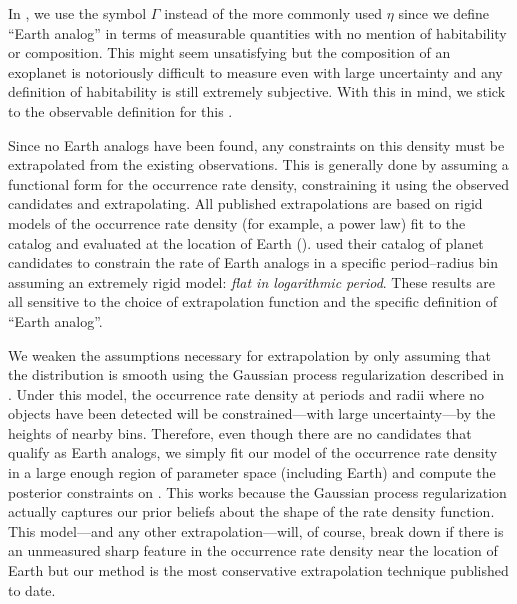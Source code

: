 In , we use the symbol $\Gamma$ instead of the more commonly
used $\eta$ since we define ``Earth analog'' in terms of measurable quantities
with no mention of habitability or composition.
This might seem unsatisfying but the composition of an exoplanet is
notoriously difficult to measure even with large uncertainty and any
definition of habitability is still extremely subjective.
With this in mind, we stick to the observable definition for this \paper.

Since no Earth analogs have been found, any constraints on this density must
be extrapolated from the existing observations.
This is generally done by assuming a functional form for the occurrence rate
density, constraining it using the observed candidates and extrapolating.
All published extrapolations are based on rigid models of the occurrence rate
density (for example, a power law) fit to the catalog and evaluated at the
location of Earth (\citealt{Catanzarite:2011, Traub:2012}).
\citet{Petigura:2013} used their catalog of planet candidates to constrain the rate
of Earth analogs in a specific period--radius bin assuming an extremely rigid
model: \emph{flat in logarithmic period}.
These results are all sensitive to the choice of extrapolation function and
the specific definition of ``Earth analog''.

We weaken the assumptions necessary for extrapolation by only assuming that
the distribution is smooth using the Gaussian process regularization described
in .
Under this model, the occurrence rate density at periods and radii where no
objects have been detected will be constrained---with large uncertainty---by
the heights of nearby bins.
Therefore, even though there are no candidates that qualify as Earth analogs,
we simply fit our model of the occurrence rate density in a large enough
region of parameter space (including Earth) and compute the posterior
constraints on \gammaearth.
This works because the Gaussian process regularization actually captures our
prior beliefs about the shape of the rate density function.
This model---and any other extrapolation---will, of course, break down if
there is an unmeasured sharp feature in the occurrence rate density near the
location of Earth but our method is the most conservative extrapolation
technique published to date.

